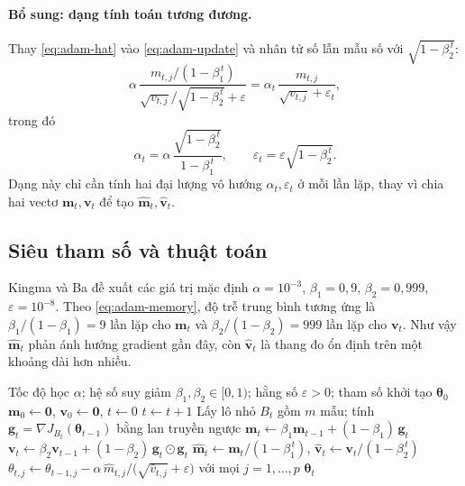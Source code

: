 \paragraph{Bổ sung: dạng tính toán tương đương.}
Thay \eqref{eq:adam-hat} vào \eqref{eq:adam-update} và nhân tử số lẫn mẫu số với $\sqrt{1-\beta_2^{\,t}}$:
\begin{equation}\label{eq:adam-efficient}
  \alpha\,\frac{m_{t,j}/(1-\beta_1^{\,t})}{\sqrt{v_{t,j}}/\sqrt{1-\beta_2^{\,t}}+\varepsilon}
  =\alpha_t\,\frac{m_{t,j}}{\sqrt{v_{t,j}}+\varepsilon_t},
\end{equation}
trong đó
\begin{equation*}
  \alpha_t=\alpha\,\frac{\sqrt{1-\beta_2^{\,t}}}{1-\beta_1^{\,t}},
  \qquad
  \varepsilon_t=\varepsilon\sqrt{1-\beta_2^{\,t}} .
\end{equation*}
Dạng này chỉ cần tính hai đại lượng vô hướng $\alpha_t,\varepsilon_t$ ở mỗi lần lặp, thay vì chia hai vectơ $\mathbf{m}_t,\mathbf{v}_t$ để tạo $\hat{\mathbf{m}}_t,\hat{\mathbf{v}}_t$.

\subsection{Siêu tham số và thuật toán}

Kingma và Ba đề xuất các giá trị mặc định $\alpha=10^{-3}$, $\beta_1=0{,}9$, $\beta_2=0{,}999$, $\varepsilon=10^{-8}$. Theo \eqref{eq:adam-memory}, độ trễ trung bình tương ứng là $\beta_1/(1-\beta_1)=9$ lần lặp cho $\mathbf{m}_t$ và $\beta_2/(1-\beta_2)=999$ lần lặp cho $\mathbf{v}_t$. Như vậy $\hat{\mathbf{m}}_t$ phản ánh hướng gradient gần đây, còn $\hat{\mathbf{v}}_t$ là thang đo ổn định trên một khoảng dài hơn nhiều.

\begin{algorithm}[t]
\caption{Adam}\label{alg:adam}
\begin{algorithmic}[1]
\Require Tốc độ học $\alpha$; hệ số suy giảm $\beta_1,\beta_2\in[0,1)$; hằng số $\varepsilon>0$; tham số khởi tạo $\boldsymbol{\theta}_0$
\State $\mathbf{m}_0\gets\mathbf{0}$, $\mathbf{v}_0\gets\mathbf{0}$, $t\gets0$
\Repeat
  \State $t\gets t+1$
  \State Lấy lô nhỏ $B_t$ gồm $m$ mẫu; tính $\mathbf{g}_t=\nabla J_{B_t}(\boldsymbol{\theta}_{t-1})$ bằng lan truyền ngược
  \State $\mathbf{m}_t\gets\beta_1\mathbf{m}_{t-1}+(1-\beta_1)\,\mathbf{g}_t$
  \State $\mathbf{v}_t\gets\beta_2\mathbf{v}_{t-1}+(1-\beta_2)\,\mathbf{g}_t\odot\mathbf{g}_t$
  \State $\hat{\mathbf{m}}_t\gets\mathbf{m}_t/(1-\beta_1^{\,t})$, \quad $\hat{\mathbf{v}}_t\gets\mathbf{v}_t/(1-\beta_2^{\,t})$
  \State $\theta_{t,j}\gets\theta_{t-1,j}-\alpha\,\hat m_{t,j}\big/\big(\sqrt{\hat v_{t,j}}+\varepsilon\big)$ với mọi $j=1,\dots,p$
\State \Return $\boldsymbol{\theta}_t$
\end{algorithmic}
\end{algorithm}

